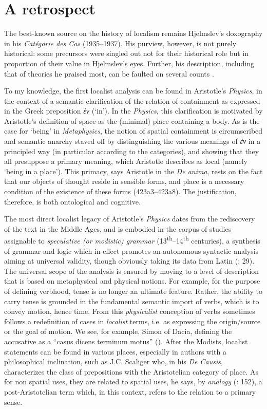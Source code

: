 \documentclass[output=paper]{langscibook}
\begin{document}
\section{A retrospect}
The best-known source on the history of localism remains Hjelmslev’s doxography in his \textit{Catégorie des Cas} (1935--1937). His purview, however, is not purely historical: some precursors were singled out not for their historical role but in proportion of their value in Hjelmslev’s eyes. Further, his description, including that of theories he praised most, can be faulted on several counts \citep{bohm_andersons_2018}. 

To my knowledge, the first localist analysis can be found in Aristotle’s \textit{Physics}, in the context of a semantic clarification of the relation of containment as expressed in the Greek preposition \textit{ἐν} (‘in’). In the \textit{Physics}, this clarification is motivated by Aristotle’s definition of space as the (minimal) place containing a body. As is the case for ‘being’ in \textit{Metaphysics}, the notion of spatial containment is circumscribed and semantic anarchy staved off by distinguishing the various meanings of \textit{ἐν} in a principled way (in particular according to the categories), and showing that they all presuppose a primary meaning, which Aristotle describes as local (namely ‘being in a place’). This primacy, says Aristotle in the \textit{De anima}, rests on the fact that our objects of thought reside in sensible forms, and place is a necessary condition of the existence of these forms (423a3--423a8). The justification, therefore, is both ontological and cognitive.

The most direct localist legacy of Aristotle’s \textit{Physics} dates from the rediscovery of the text in the Middle Ages, and is embodied in the corpus of studies assignable to \textit{speculative (or modistic) grammar} (13\textsuperscript{th}--14\textsuperscript{th} centuries), a synthesis of grammar and logic which in effect promotes an autonomous syntactic analysis aiming at universal validity, though obviously taking its data from Latin (\citealt{bursill-hall_speculative_1971}: 29). The universal scope of the analysis is ensured by moving to a level of description that is based on metaphysical and physical notions. For example, for the purpose of defining verbhood, tense is no longer an ultimate feature. Rather, the ability to carry tense is grounded in the fundamental semantic import of verbs, which is to convey motion, hence time. From this \textit{physicalist} conception of verbs sometimes follows a redefinition of cases in \textit{localist} terms, i.e. as expressing the origin\slash source or the goal of motion. We see, for example, Simon of Dacia, defining the accusative as a “casus dicens terminum motus” (\citealt{joly_physique_1977}). After the Modists, localist statements can be found in various places, especially in authors with a philosophical inclination, such as J.C. Scaliger who, in his \textit{De Causis}, characterizes the class of prepositions with the Aristotelian category of place. As for non spatial uses, they are related to spatial uses, he says, by \textit{analogy} (\citeyear{scaliger_causis_2018}: 152), a post-Aristotelian term which, in this context, refers to the relation to a primary sense.
\end{document}
